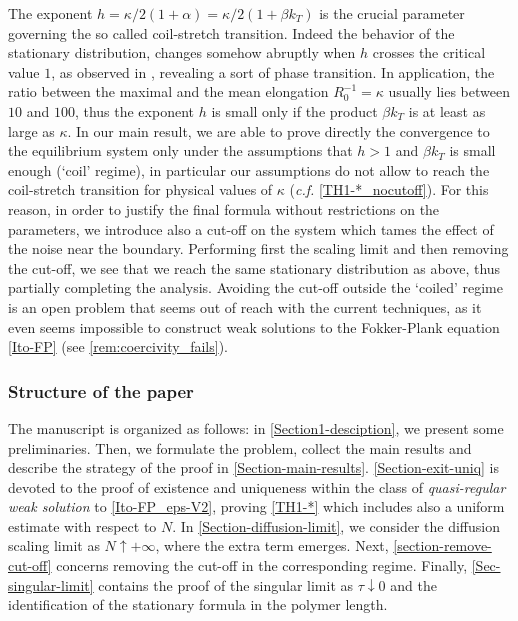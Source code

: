 \documentclass[a4paper,12pt, reqno]{amsart}
\renewcommand{\k}{\kappa}
\begin{document}
 The exponent $h= \k/2(1+\alpha)= \k/2(1+ \beta k_T)$ is the crucial parameter governing the so called coil-stretch transition. Indeed the behavior of the stationary distribution, changes somehow abruptly when $h$ crosses the critical value $1$, as observed in \cite{Afonso2005nonlinear}, revealing a sort of phase transition. 
 In application, the ratio between the maximal and the mean elongation $R_0^{-1} = \k$ usually lies between $10$ and $100$, thus the exponent $h$ is small only if the product $\beta k_T$ is at least as large as $\kappa$. In our main result, we are able to prove directly the convergence to the equilibrium system only under the assumptions that $h>1$ and $\beta k_T$ is small enough (`coil' regime), in particular our assumptions do not allow to reach the coil-stretch transition for physical values of $\kappa$ (\textit{c.f.} \autoref{TH1-*_nocutoff}). For this reason, in order to justify the final formula without restrictions on the parameters, we introduce also a cut-off on the system which tames the effect of the noise near the boundary. Performing first the scaling limit and then removing the cut-off, we see that we reach the same stationary distribution as above, thus partially completing the analysis. Avoiding the cut-off outside the `coiled' regime is an open problem that seems out of reach with the current techniques, as it even seems impossible to construct weak solutions to the Fokker-Plank equation \eqref{Ito-FP} (see \autoref{rem:coercivity_fails}). 

\subsubsection*{Structure of the paper} The manuscript is organized as follows: in \autoref{Section1-desciption}, we present some preliminaries. Then, we  formulate the problem,  collect the main  results and describe the strategy of the proof in \autoref{Section-main-results}.  \autoref{Section-exit-uniq} is devoted to the  proof of  existence and uniqueness within the class of \textit{quasi-regular weak solution} to \eqref{Ito-FP_eps-V2}, proving \autoref{TH1-*} which includes also a  uniform estimate with respect to $N$. In  \autoref{Section-diffusion-limit}, we     consider  the diffusion scaling limit    as $N\uparrow +\infty$, where   the  extra term emerges. Next,  \autoref{section-remove-cut-off} concerns  removing the cut-off in the corresponding regime. Finally, \autoref{Sec-singular-limit} contains the proof of the singular limit as $\tau\downarrow 0$ and the identification of the stationary formula in the polymer length.
\end{document}
